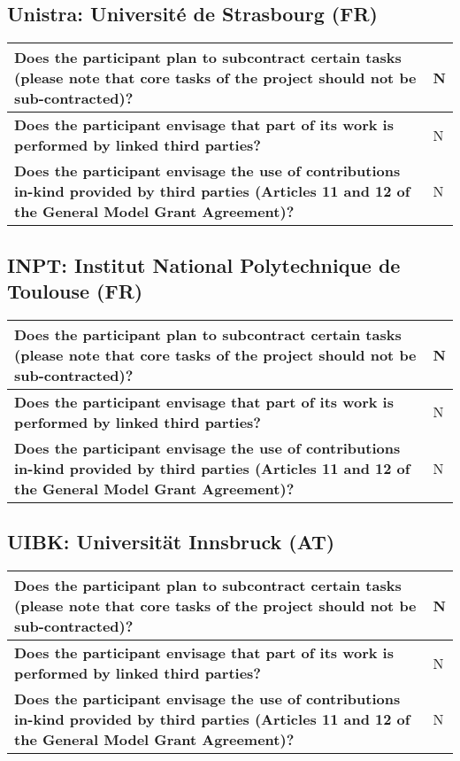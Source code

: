 \subsection*{Unistra: Université de Strasbourg (FR)}

\begin{longtable*}{|p{0.75\textwidth}|p{0.2\textwidth}|}
\hline
{\bf Does the participant plan to subcontract certain tasks (please
  note that core tasks of the project should not be sub-contracted)?}
&
N
\\
\hline
{\bf Does the participant envisage that  part of its work is performed
  by linked third parties?}
&
N
\\
\hline
{\bf Does the participant envisage the use of contributions in-kind
provided by third parties (Articles 11 and 12 of the General Model
Grant Agreement)?}
&
N
\\
\hline
\end{longtable*}


\subsection*{INPT: Institut National Polytechnique de Toulouse (FR)}

\begin{longtable*}{|p{0.75\textwidth}|p{0.2\textwidth}|}
\hline
{\bf Does the participant plan to subcontract certain tasks (please
  note that core tasks of the project should not be sub-contracted)?}
&
N
\\
\hline
{\bf Does the participant envisage that  part of its work is performed
  by linked third parties?}
&
N
\\
\hline
{\bf Does the participant envisage the use of contributions in-kind
provided by third parties (Articles 11 and 12 of the General Model
Grant Agreement)?}
&
N
\\
\hline
\end{longtable*}

\subsection*{UIBK: Universität Innsbruck (AT)}

\begin{longtable*}{|p{0.75\textwidth}|p{0.2\textwidth}|}
\hline
{\bf Does the participant plan to subcontract certain tasks (please
  note that core tasks of the project should not be sub-contracted)?}
&
N
\\
\hline
{\bf Does the participant envisage that  part of its work is performed
  by linked third parties?}
&
N
\\
\hline
{\bf Does the participant envisage the use of contributions in-kind
provided by third parties (Articles 11 and 12 of the General Model
Grant Agreement)?}
&
N
\\
\hline
\end{longtable*}

